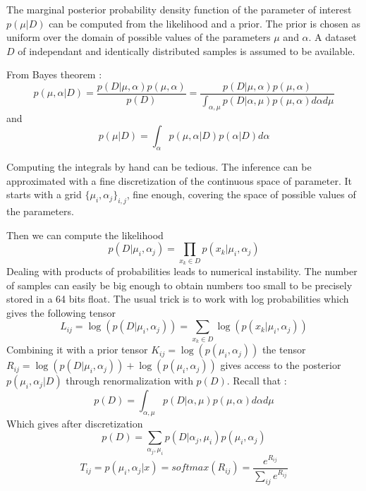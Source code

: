The marginal posterior probability density function of the parameter of interest $p(\mu|D)$ can be computed from the likelihood and a prior.
The prior is chosen as uniform over the domain of possible values of the parameters $\mu$ and $\alpha$.
A dataset $D$ of independant and identically distributed samples is assumed to be available.

From Bayes theorem : 
\begin{equation}
    p(\mu, \alpha | D) = \frac{p(D|\mu, \alpha) p(\mu, \alpha)}{p(D)} = \frac{p(D|\mu, \alpha) p(\mu, \alpha)}{\int_{\alpha, \mu} p(D|\alpha, \mu) p(\mu, \alpha) d\alpha d\mu}
\end{equation}
and
\begin{equation}
	p(\mu|D) = \int_{\alpha} p(\mu, \alpha | D) p(\alpha|D) d\alpha
\end{equation}

Computing the integrals by hand can be tedious.
The inference can be approximated with a fine discretization of the continuous space of parameter.
It starts with a grid $\{\mu_i, \alpha_j\}_{i,j}$, fine enough, covering the space of possible values of the parameters.

Then we can compute the likelihood
\begin{equation}
	p(D|\mu_i, \alpha_j) = \prod_{x_k\in D} p(x_k|\mu_i, \alpha_j)
\end{equation}
Dealing with products of probabilities leads to numerical instability.
The number of samples can easily be big enough to obtain numbers too small to be precisely stored in a 64 bits float.
The usual trick is to work with log probabilities which gives the following tensor 
\begin{equation}
	L_{ij} = \log (p(D|\mu_i, \alpha_j)) = \sum_{x_k\in D} \log (p(x_k|\mu_i, \alpha_j))
\end{equation}
Combining it with a prior tensor $K_{ij} = \log(p(\mu_i, \alpha_j))$ the tensor $ R_{ij} = \log(p(D|\mu_i, \alpha_j)) + \log(p(\mu_i, \alpha_j) )$ gives access to the posterior $p(\mu_i, \alpha_j | D)$ through renormalization with $p(D)$.
Recall that :
\begin{equation}
    p(D) = \int_{\alpha, \mu} p(D|\alpha, \mu) p(\mu, \alpha) d\alpha d\mu
\end{equation}
Which gives after discretization
\begin{equation}
    p(D) = \sum_{\alpha_j, \mu_i} p(D|\alpha_j, \mu_i) p(\mu_i, \alpha_j)
\end{equation}
\begin{equation}
	T_{ij} = p(\mu_i, \alpha_j | x) = softmax(R_{ij}) = \frac{ e^{ R_{ij} }  }{ \sum_{ij} e^{ R_{ij} } }
\end{equation}

